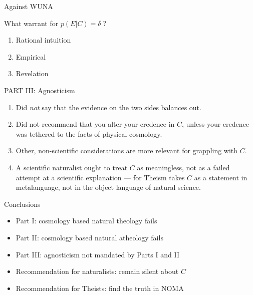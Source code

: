 \documentclass{beamer}
\begin{document}
\begin{frame}{Against WUNA}

  What warrant for $p(E|C)=\delta\;$?

\begin{enumerate}
\item Rational intuition
\item Empirical
\item Revelation
\end{enumerate}


\end{frame}


\begin{frame}{PART III: Agnosticism}

\begin{enumerate}
\item Did \emph{not} say that the evidence on the two sides balances
  out.
\item Did not recommend that you alter your credence in $C$, unless
  your credence was tethered to the facts of physical cosmology.
\item Other, non-scientific considerations are more relevant for
  grappling with $C$.
\item A scientific naturalist ought to treat $C$ as meaningless, not
  as a failed attempt at a scientific explanation --- for Theism takes
  $C$ as a statement in metalanguage, not in the object language of
  natural science. \end{enumerate}


\end{frame}

\begin{frame}{Conclusions}

\begin{itemize}
\item Part I: cosmology based natural theology fails
\item Part II: cosmology based natural atheology fails
\item Part III: agnosticism not mandated by Parts I and II
\item Recommendation for naturalists: remain silent about $C$
\item Recommendation for Theists: find the truth in NOMA
\end{itemize}



\end{frame}
\end{document}
